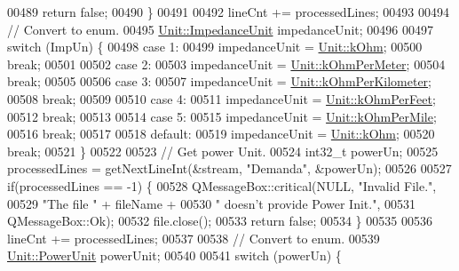 \begin{DoxyCode}
00489     \textcolor{keywordflow}{return} \textcolor{keyword}{false};
00490   \}
00491 
00492   lineCnt += processedLines;
00493 
00494   \textcolor{comment}{// Convert to enum.}
00495   \hyperlink{class_unit_a3747e779c805df24a71961290be3fbdf}{Unit::ImpedanceUnit} impedanceUnit;
00496 
00497   \textcolor{keywordflow}{switch} (ImpUn) \{
00498   \textcolor{keywordflow}{case} 1:
00499     impedanceUnit = \hyperlink{class_unit_a3747e779c805df24a71961290be3fbdfa6b9c74d1763eefbaf751eeecff0bd9da}{Unit::kOhm};
00500     \textcolor{keywordflow}{break};
00501 
00502   \textcolor{keywordflow}{case} 2:
00503     impedanceUnit = \hyperlink{class_unit_a3747e779c805df24a71961290be3fbdfa35e9ca44deb5a35fdb576111cf0db336}{Unit::kOhmPerMeter};
00504     \textcolor{keywordflow}{break};
00505 
00506   \textcolor{keywordflow}{case} 3:
00507     impedanceUnit = \hyperlink{class_unit_a3747e779c805df24a71961290be3fbdfa56a0289d2ddeff7ca4aa8ba410df79d6}{Unit::kOhmPerKilometer};
00508     \textcolor{keywordflow}{break};
00509 
00510   \textcolor{keywordflow}{case} 4:
00511     impedanceUnit = \hyperlink{class_unit_a3747e779c805df24a71961290be3fbdfa433b57934ca3be960ec7a60f3ea6ea87}{Unit::kOhmPerFeet};
00512     \textcolor{keywordflow}{break};
00513 
00514   \textcolor{keywordflow}{case} 5:
00515     impedanceUnit = \hyperlink{class_unit_a3747e779c805df24a71961290be3fbdfa1d5bb04c9ecda66b09891af21cd4f613}{Unit::kOhmPerMile};
00516     \textcolor{keywordflow}{break};
00517 
00518   \textcolor{keywordflow}{default}:
00519     impedanceUnit = \hyperlink{class_unit_a3747e779c805df24a71961290be3fbdfa6b9c74d1763eefbaf751eeecff0bd9da}{Unit::kOhm};
00520     \textcolor{keywordflow}{break};
00521   \}
00522 
00523   \textcolor{comment}{// Get power Unit.}
00524   int32\_t powerUn;
00525   processedLines = getNextLineInt(&stream, \textcolor{stringliteral}{"Demanda"}, &powerUn);
00526 
00527   \textcolor{keywordflow}{if}(processedLines == -1) \{
00528     QMessageBox::critical(NULL, \textcolor{stringliteral}{"Invalid File."},
00529                           \textcolor{stringliteral}{"The file "} + fileName +
00530                           \textcolor{stringliteral}{" doesn't provide Power Init."},
00531                           QMessageBox::Ok);
00532     file.close();
00533     \textcolor{keywordflow}{return} \textcolor{keyword}{false};
00534   \}
00535 
00536   lineCnt += processedLines;
00537 
00538   \textcolor{comment}{// Convert to enum.}
00539   \hyperlink{class_unit_ace265ae255370ccacfd5370337572c3b}{Unit::PowerUnit} powerUnit;
00540 
00541   \textcolor{keywordflow}{switch} (powerUn) \{

\end{DoxyCode}

